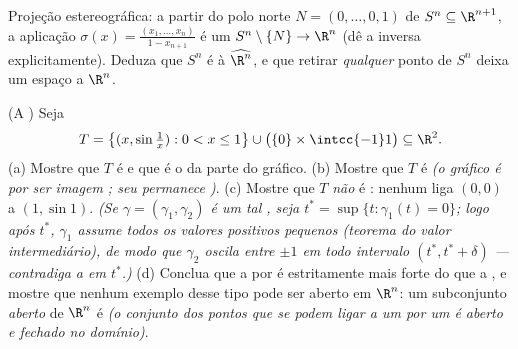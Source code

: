 \begin{exercise}[$\star\star\star$]\label{exo:b3:topology:11}
Projeção estereográfica: a partir do polo norte $N = (0, \dots,
0, 1)$ de $S^n \subseteq \R^{n+1}$, a
aplicação $\sigma(x) =
\frac{(x_1, \dots, x_n)}{1 - x_{n+1}}$ é um  $S^n
\setminus \{N\} \to \R^n$ (dê a inversa explicitamente).
Deduza que $S^n$ é  à  $\widehat{\R^n}$,
e que retirar \emph{qualquer} ponto de $S^n$ deixa um espaço
 a $\R^n$.
\end{exercise}

\begin{exercise}[$\star\star\star$]\label{exo:b3:topology:12}
(A ) Seja
\[
T = \bigl\{(x, \sin\tfrac1x) : 0 < x \leq 1\bigr\}
\cup \bigl(\{0\}\times\intcc{-1}1\bigr) \subseteq \R^2 .
\]
(a) Mostre que $T$ é  e que é o  da parte do gráfico.
(b) Mostre que $T$ é  \emph{(o gráfico é  por ser
imagem ; seu  permanece )}.
(c) Mostre que $T$ \emph{não} é : nenhum 
 liga $(0,0)$ a $(1, \sin1)$. \emph{(Se $\gamma =
(\gamma_1, \gamma_2)$ é um tal ,
seja $t^* = \sup\{t :
\gamma_1(t) = 0\}$; logo após $t^*$, $\gamma_1$ assume todos os valores
positivos pequenos (teorema do valor intermediário), de modo que $\gamma_2$
oscila entre $\pm1$ em todo intervalo $(t^*, t^* + \delta)$ --- contradiga a
 em $t^*$.)}
(d) Conclua que a  por  é estritamente mais forte do
que a , e mostre que nenhum exemplo desse tipo pode ser
aberto em $\R^n$: um subconjunto \emph{aberto}  de $\R^n$
é  \emph{(o conjunto dos pontos que se podem ligar a
um  por um  é aberto e fechado no domínio)}.
\end{exercise}

